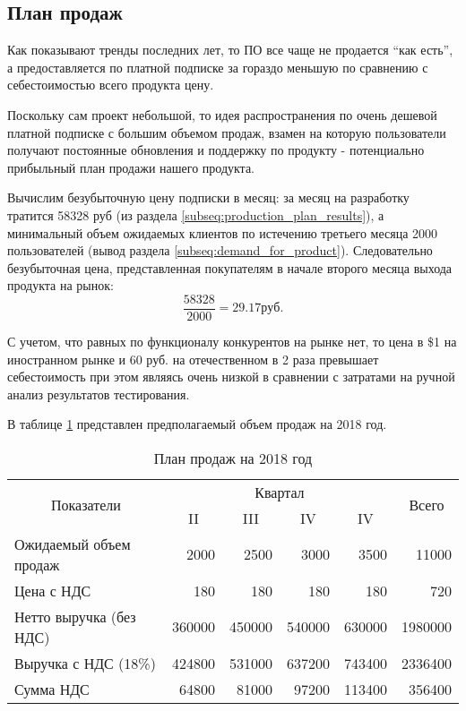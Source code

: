 \subsection{План продаж}
	Как показывают тренды последних лет, то ПО все чаще не продается \enquote{как есть}, а предоставляется по платной подписке за гораздо меньшую по сравнению с себестоимостью всего продукта цену. 
	
	Поскольку сам проект небольшой, то идея распространения по очень дешевой платной подписке с большим объемом продаж, взамен на которую пользователи получают постоянные обновления и поддержку по продукту - потенциально прибыльный план продажи нашего продукта.
	
	Вычислим безубыточную цену подписки в месяц: за месяц на разработку тратится 58328 руб (из раздела \ref{subseq:production_plan_results}), а минимальный объем ожидаемых клиентов по истечению третьего месяца 2000 пользователей (вывод раздела \ref{subseq:demand_for_product}). Следовательно безубыточная цена, представленная покупателям в начале второго месяца выхода продукта на рынок:
	\[
		\dfrac{58328}{2000} = 29.17 руб.
	\]
	
	С учетом, что равных по функционалу конкурентов на рынке нет, то цена в \$1 на иностранном рынке и 60 руб. на отечественном в 2 раза превышает себестоимость при этом являясь очень низкой в сравнении с затратами на ручной анализ результатов тестирования.
	
	В таблице \ref{table:trading_plan} представлен предполагаемый объем продаж на 2018 год.
		
	\begin{table}[!h]
		\def\arraystretch{1.3}
		\centering	
		\begin{tabular}{|p{3cm}|r|r|r|r|r|}
			\hline
			\multicolumn{1}{|c|}{\multirow{2}{*}{Показатели}} & \multicolumn{4}{c|}{Квартал} & \multicolumn{1}{c|}{\multirow{2}{*}{Всего}} \\ \cline{2-5}
			\multicolumn{1}{|c|}{} & \multicolumn{1}{c|}{II} & \multicolumn{1}{c|}{III} & \multicolumn{1}{c|}{IV} & \multicolumn{1}{c|}{IV} & \multicolumn{1}{c|}{} \\ \hline
			Ожидаемый объем продаж & 2000 & 2500 & 3000 & 3500 & 11000 \\ \hline
			Цена с НДС & 180 & 180 & 180 & 180 & 720 \\ \hline
			Нетто выручка (без НДС) & 360000 & 450000 & 540000 & 630000 & 1980000 \\ \hline
			Выручка с НДС (18\%) & 424800 & 531000 & 637200 & 743400 & 2336400 \\ \hline
			Сумма НДС & 64800 & 81000 & 97200 & 113400 & 356400 \\ \hline
		\end{tabular}
		\caption{План продаж на 2018 год}
		\label{table:trading_plan}
	\end{table}
	
